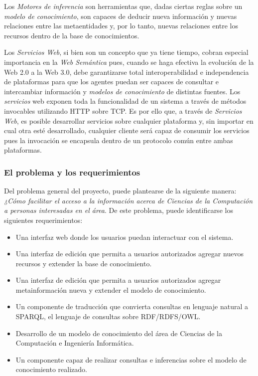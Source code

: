 Los \textit{Motores de inferencia} son herramientas que, dadas ciertas reglas sobre un \textit{modelo de conocimiento}, son capaces de deducir nueva información y nuevas relaciones entre las metaentidades y, por lo tanto, nuevas relaciones entre los recursos dentro de la base de conocimientos.

Los \textit{Servicios Web}, si bien son un concepto que ya tiene tiempo, cobran especial importancia en la \textit{Web Semántica} pues, cuando se haga efectiva la evolución de la Web 2.0 a la Web 3.0, debe garantizarse total interoperabilidad e independencia de plataformas para que los agentes puedan ser capaces de consultar e intercambiar información y \textit{modelos de conocimiento} de distintas fuentes. Los \textit{servicios} web exponen toda la funcionalidad de un sistema a través de métodos invocables utilizando HTTP sobre TCP. Es por ello que, a través de \textit{Servicios Web}, es posible desarrollar servicios sobre cualquier plataforma y, sin importar en cual otra esté desarrollado, cualquier cliente será capaz de consumir los servicios pues la invocación se encapsula dentro de un protocolo común entre ambas plataformas.

\subsubsection{El problema y los requerimientos}
Del problema general del proyecto, puede plantearse de la siguiente manera: \textit{¿Cómo facilitar el acceso a la información acerca de Ciencias de la Computación a personas interesadas en el área}. De este problema, puede identificarse los siguientes requerimientos:

\begin{itemize}
\item Una interfaz web donde los usuarios puedan interactuar con el sistema.
\item Una interfaz de edición que permita a usuarios autorizados agregar nuevos recursos y extender la base de conocimiento.
\item Una interfaz de edición que permita a usuarios autorizados agregar metainformación nueva y extender el modelo de conocimiento.
\item Un componente de traducción que convierta consultas en lenguaje natural a SPARQL, el lenguaje de consultas sobre RDF/RDFS/OWL.
\item Desarrollo de un modelo de conocimiento del área de Ciencias de la Computación e Ingeniería Informática.
\item Un componente capaz de realizar consultas e inferencias sobre el modelo de conocimiento realizado.
\end{itemize}


